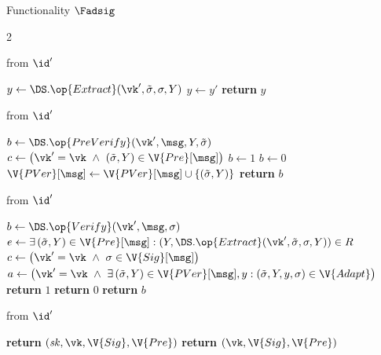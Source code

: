 \begin{interface}[nofloat]{Functionality $\Fadsig$ \\
}
{\begin{multicols}{2}
\columnbreak

 \quad from $\id'$
\begin{algorithmic}[1]
\algcont
\State $y \gets \DS.\op{Extract}(\vk', \tilde{\sigma}, \sigma, Y)$
\State $y \gets y'$ \label{ln:adsigextcorr}
\EndIf
\State \textbf{return} $y$
\algsave
\end{algorithmic}
\vspace{1.4ex}

 \quad from $\id'$
\begin{algorithmic}[1]
\algcont
\State $b \gets \DS.\op{PreVerify}(\vk', \msg, Y, \tilde{\sigma})$
\State $c \gets \bigl(\vk' = \vk \ \wedge\ (\tilde{\sigma}, Y) \in \V{Pre}[\msg]\bigr)$
\State $b \gets 1$ \label{ln:adsigpcorr}
\EndIf
{}
\State $b \gets 0$ \label{ln:adsigpunforge}
\EndIf
{}
\State $\V{PVer}[\msg] \gets \V{PVer}[\msg] \cup \{(\tilde{\sigma}, Y)\}$
\EndIf
\State \textbf{return} $b$
\algsave
\end{algorithmic}
\vspace{1.4ex}

 \quad from $\id'$
\begin{algorithmic}[1]
\algcont
\State $b \gets \DS.\op{Verify}(\vk', \msg, \sigma)$
\State $e \gets \exists\, (\tilde{\sigma}, Y) \in \V{Pre}[\msg] : (Y, \DS.\op{Extract}(\vk', \tilde{\sigma}, \sigma, Y)) \in R$
\State $c \gets \bigl(\vk' = \vk \ \wedge\ \sigma \in \V{Sig}[\msg]\bigr)$
\State $a \gets \bigl(\vk' = \vk \ \wedge\ \exists\, (\tilde{\sigma},Y) \in \V{PVer}[\msg], y : (\tilde{\sigma}, Y, y, \sigma) \in \V{Adapt}\bigr)$
 \label{ln:adsigcorr}
\State \textbf{return} $1$
\EndIf
{}
\State \textbf{return} $0$ \label{ln:adsigext}
\EndIf
\State \textbf{return} $b$
\algsave
\end{algorithmic}
\vspace{1.4ex}

 \quad from $\id'$
\begin{algorithmic}[1]
\algcont
{}
\State \textbf{return} $(\mathit{sk}, \vk, \V{Sig}, \V{Pre})$ \label{ln:adsigleaksk}
\EndIf
\State \textbf{return} $(\vk, \V{Sig}, \V{Pre})$
\algsave
\end{algorithmic}
\end{multicols}}
\end{interface}
